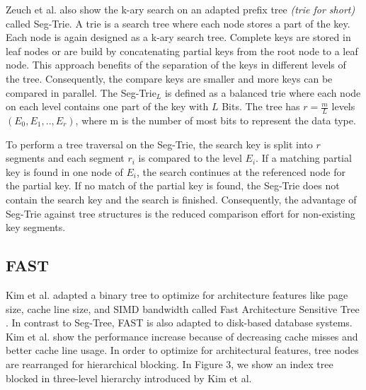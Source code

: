 \documentclass[conference]{IEEEtran}
\begin{document}
Zeuch et al. also show the k-ary search on an adapted prefix tree \emph{(trie for short)} called Seg-Trie. A trie is a search tree where each node stores a part of the key. Each node is again designed as a k-ary search tree. Complete keys are stored in leaf nodes or are build by concatenating partial keys from the root node to a leaf node. This approach benefits of the separation of the keys in different levels of the tree. Consequently, the compare keys are smaller and more keys can be compared in parallel. The Seg-Trie$_L$ is defined as a balanced trie where each node on each level contains one part of the key with $L$ Bits. The tree has $r = \frac{m}{L}$ levels $(E_0, E_1, .., E_r)$, where m is the number of most bits to represent the data type.

To perform a tree traversal on the Seg-Trie, the search key is split into $r$ segments and each segment $r_i$ is compared to the level $E_i$. If a matching partial key is found in one node of $E_i$, the search continues at the referenced node for the partial key. If no match of the partial key is found, the Seg-Trie does not contain the search key and the search is finished. Consequently, the advantage of Seg-Trie against tree structures is the reduced comparison effort for non-existing key segments. 


\subsection{FAST}\label{SCM}
Kim et al. adapted a binary tree to optimize for architecture features like page size, cache line size, and SIMD bandwidth called Fast Architecture Sensitive Tree \cite{b6}. In contrast to Seg-Tree, FAST is also adapted to disk-based database systems. Kim et al. show the performance increase because of decreasing cache misses and better cache line usage. In order to optimize for architectural features, tree nodes are rearranged for hierarchical blocking. In Figure 3, we show an index tree blocked in three-level hierarchy introduced by Kim et al. 
\end{document}
